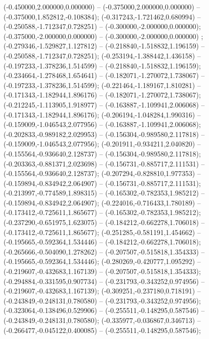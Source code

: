  (-0.450000,2.000000,0.000000) -- (-0.375000,2.000000,0.000000) -- (-0.375000,1.852812,-0.108384);
 (-0.317243,-1.721462,0.680994) -- (-0.250588,-1.712347,0.728251) -- (-0.300000,-2.000000,0.000000);
 (-0.375000,-2.000000,0.000000) -- (-0.300000,-2.000000,0.000000) ;
 (-0.279346,-1.529827,1.127812) -- (-0.218840,-1.518832,1.196159) -- (-0.250588,-1.712347,0.728251);
 (-0.253194,-1.388442,1.436158) -- (-0.197233,-1.378236,1.514599) -- (-0.218840,-1.518832,1.196159);
 (-0.234664,-1.278468,1.654641) -- (-0.182071,-1.270072,1.738067) -- (-0.197233,-1.378236,1.514599);
 (-0.221464,-1.189167,1.810281) -- (-0.171343,-1.182944,1.896176) -- (-0.182071,-1.270072,1.738067);
 (-0.212245,-1.113905,1.918977) -- (-0.163887,-1.109941,2.006068) -- (-0.171343,-1.182944,1.896176);
 (-0.206194,-1.048284,1.990316) -- (-0.159009,-1.046543,2.077956) -- (-0.163887,-1.109941,2.006068);
 (-0.202833,-0.989182,2.029953) -- (-0.156304,-0.989580,2.117818) -- (-0.159009,-1.046543,2.077956);
 (-0.201911,-0.934211,2.040820) -- (-0.155564,-0.936640,2.128737) -- (-0.156304,-0.989580,2.117818);
 (-0.203363,-0.881371,2.023698) -- (-0.156731,-0.885717,2.111531) -- (-0.155564,-0.936640,2.128737);
 (-0.207294,-0.828810,1.977353) -- (-0.159894,-0.834942,2.064907) -- (-0.156731,-0.885717,2.111531);
 (-0.213997,-0.774589,1.898315) -- (-0.165302,-0.782353,1.985212) -- (-0.159894,-0.834942,2.064907);
 (-0.224016,-0.716433,1.780189) -- (-0.173412,-0.725611,1.865677) -- (-0.165302,-0.782353,1.985212);
 (-0.237290,-0.651975,1.623075) -- (-0.184212,-0.662278,1.706018) -- (-0.173412,-0.725611,1.865677);
 (-0.251285,-0.581191,1.454662) -- (-0.195665,-0.592364,1.534446) -- (-0.184212,-0.662278,1.706018);
 (-0.265666,-0.504090,1.278262) -- (-0.207507,-0.515818,1.354333) -- (-0.195665,-0.592364,1.534446);
 (-0.280269,-0.420777,1.095292) -- (-0.219607,-0.432683,1.167139) -- (-0.207507,-0.515818,1.354333);
 (-0.294884,-0.331595,0.907734) -- (-0.231793,-0.343252,0.974956) -- (-0.219607,-0.432683,1.167139);
 (-0.309251,-0.237180,0.718191) -- (-0.243849,-0.248131,0.780580) -- (-0.231793,-0.343252,0.974956);
 (-0.323064,-0.138496,0.529906) -- (-0.255511,-0.148295,0.587546) -- (-0.243849,-0.248131,0.780580);
 (-0.335977,-0.036867,0.346713) -- (-0.266477,-0.045122,0.400085) -- (-0.255511,-0.148295,0.587546);
